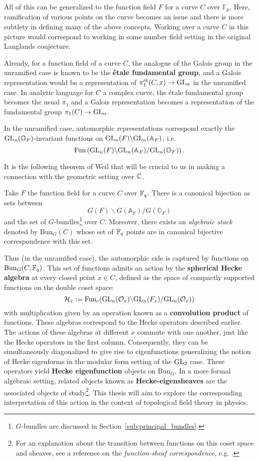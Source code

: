 All of this can be generalized to the function field $F$ for a curve $C$ over $\mathbb F_p$. Here, ramification of various points on the curve becomes an issue and there is more subtlety in defining many of the above concepts. Working over a curve $C$ in this picture would correspond to working in some number field setting in the original Langlands conjecture. 

Already, for a function field of a curve $C$, the analogue of the Galois group in the unramified case is known to be the \textbf{\'etale fundamental group}, and a Galois representation would be a representation of $\pi_1^{\text{\'et}}(C,x) \to \mathrm{GL}_n$ in the unramified case. In analytic language for $C$ a complex curve, the \'etale fundamental group becomes the usual $\pi_1$ and a Galois representation becomes a representation of the fundamental group $\pi_1(C) \to \mathrm{GL}_n$. 

In the unramified case, automorphic representations correspond exactly the $\mathrm{GL}_n(\mathbb O_F)$-invariant functions on $\mathrm{GL}_n (F)\backslash \mathrm{GL}_n(\mathbb A_F)$, i.e. 
\[
	\mathrm{Fun} \left(\mathrm{GL}_n (F)\backslash \mathrm{GL}_n(\mathbb A_F)/\mathrm{GL}_n(\mathbb O_F) \right).
\]

It is the following theorem of Weil that will be crucial to us in making a connection with the geometric setting over $\mathbb{C}$.
\begin{theorem}
	Take $F$ the function field for a curve $C$ over $\mathbb{F}_q$. There is a canonical bijection as sets between
	\[
		G (F)\backslash G(\mathbb A_F)/G(\mathbb O_F)
	\]
	and the set of $G$-bundles\footnote{$G$-bundles are discussed in Section~\ref{sub:principal_bundles}.} over $C$. Moreover, there exists an \emph{algebraic stack} denoted by $\mathrm{Bun}_G(C)$ whose set of $\mathbb{F}_q$ points are in canonical bijective correspondence with this set.
\end{theorem}

Thus (in the unramified case), the automorphic side is captured by functions on $\mathrm{Bun}_G(C, \mathbb{F}_q)$. 
This set of functions admits an action by the \textbf{spherical Hecke algebra} at every closed point $x \in C$, defined as the space of compactly supported functions on the double coset space:
\[
	\mathcal H_x := \mathrm{Fun}_c (\mathrm{GL}_n (\mathcal O_x)\backslash \mathrm{GL}_n(F_x)/\mathrm{GL}_n(\mathcal O_x))
\]
with multiplication given by an operation known as a \textbf{convolution product} of functions. These algebras correspond to the Hecke operators described earlier. The actions of these algebras at different $x$ commute with one another, just like the Hecke operators in the first column. Consequently, they can be simultaneously diagonalized to give rise to eigenfunctions generalizing the notion of Hecke eigenforms in the modular form setting of the $\mathrm{GL}_2$ case. These operators yield \textbf{Hecke eigenfunction} objects on $\mathrm{Bun}_G$. In a more formal algebraic setting, related objects known as \textbf{Hecke-eigensheaves} are the associated objects of study\footnote{For an explanation about the transition between functions on this coset space and sheaves, see a reference on the \emph{function-sheaf correspondence}, e.g. \cite{shin2005}.}. This thesis will aim to explore the corresponding interpretation of this action in the context of topological field theory in physics.

